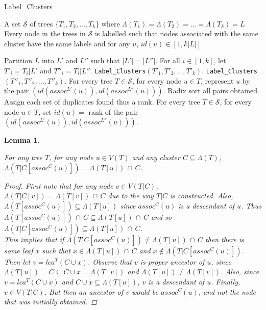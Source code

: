 \documentclass{article}
\newcommand{\leafset}{\Lambda}
\newtheorem{assocnode}[incompatibility]{Lemma}
\begin{document}
    \begin{algorithm}
        \caption{Label\_Clusters}
        \begin{algorithmic}[1]
            \Input A set $\mathcal{S}$ of trees $\{T_1, T_2, ..., T_k\}$ where $\leafset(T_1) = \leafset(T_2) = ... = \leafset(T_k) = L$
            \Output Every node in the trees in $\mathcal{S}$ is labelled such that nodes associated with the same cluster have the same labels and for any $u$, $id(u) \in [1, k |L|]$

            \State Partition $L$ into $L'$ and $L''$ such that $|L'| = |L''|$.
            \State For all $i \in [1,k]$, let $T'_i = T_i|L'$ and $T''_i = T_i|L''$.
            \State \texttt{Label\_Clusters}$(T'_1, T'_2, ..., T'_k)$.
            \State \texttt{Label\_Clusters}$(T''_1, T''_2, ..., T''_k)$.
            \State For every tree $T \in \mathcal{S}$, for every node $u \in T$, represent $u$ by the pair $(id(assoc^{L'}(u)), id(assoc^{L''}(u)))$.
            \State Radix sort all pairs obtained. Assign each set of duplicates found thus a rank.
            \State For every tree $T \in \mathcal{S}$, for every node $u \in T$, set $id(u) = $ rank of the pair $(id(assoc^{L'}(u)), id(assoc^{L''}(u)))$.
        \end{algorithmic}
    \end{algorithm}

    \begin{assocnode}
        \label{lem:assocnode}

        For any tree $T$, for any node $u \in V(T)$ and any cluster $C \subseteq \leafset(T)$, $\leafset(T|C[assoc^C(u)]) = \leafset(T[u])\, \cap\, C$.

        \begin{proof}
            First note that for any node $v \in V(T|C)$, $\leafset(T|C[v]) = \leafset(T[v])\, \cap\, C$ due to the way $T|C$ is constructed. Also, $\leafset(T[assoc^C(u)]) \subseteq \leafset(T[u])$ since $assoc^C(u)$ is a descendant of $u$. Thus $\leafset(T[assoc^C(u)])\, \cap\, C \subseteq \leafset(T[u])\, \cap\, C$ and so $\leafset(T|C[assoc^C(u)]) \subseteq \leafset(T[u])\, \cap\, C$.\\

            This implies that if $\leafset(T|C[assoc^C(u)]) \neq \leafset(T[u])\, \cap\, C$ then there is some leaf $x$ such that $x \in \leafset(T[u])\, \cap\, C$ and $x \not\in \leafset(T|C[assoc^C(u)])$. Then let $v = lca^T(C \cup x)$. Observe that $v$ is proper ancestor of $u$, since $\leafset(T[u]) = C \subseteq C \cup x = \leafset(T[v])$ and $\leafset(T[u]) \neq \leafset(T[v])$. Also, since $v = lca^T(C \cup x)$ and $C \cup x \subseteq \leafset(T[u])$, $v$ is a descendant of $u$. Finally, $v \in V(T|C)$. But then an ancestor of $v$ would be $assoc^C(u)$, and not the node that was initially obtained.
        \end{proof}
    \end{assocnode}
\end{document}
